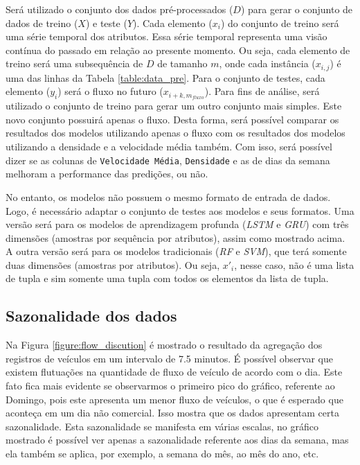 Será utilizado o conjunto dos dados pré-processados (\(D\)) para gerar o conjunto de dados de treino (\(X\)) e teste (\(Y\)). Cada elemento (\(x_i\)) do conjunto de treino  será uma série temporal dos atributos. Essa série temporal representa uma visão contínua do passado em relação ao presente momento. Ou seja, cada elemento de treino será uma subsequência de \(D\) de tamanho \(m\), onde cada instância (\(x_{i, j}\)) é uma das linhas da Tabela \ref{table:data_pre}. Para o conjunto de testes, cada elemento (\(y_i\)) será o fluxo no futuro (\(x_{i + k, m_{fluxo}}\)). Para fins de análise, será utilizado o conjunto de treino para gerar um outro conjunto mais simples. Este novo conjunto possuirá apenas o fluxo. Desta forma, será possível comparar os resultados dos modelos utilizando apenas o fluxo com os resultados dos modelos utilizando a densidade e a velocidade média também. Com isso, será possível dizer se as colunas de \texttt{Velocidade Média}, \texttt{Densidade} e as de dias da semana melhoram a performance das predições, ou não. 

No entanto, os modelos não possuem o mesmo formato de entrada de dados. Logo, é necessário adaptar o conjunto de testes aos modelos e seus formatos. Uma versão será para os modelos de aprendizagem profunda (\textit{\acrshort{LSTM}} e \textit{\acrshort{GRU}}) com três dimensões (amostras por sequência por atributos), assim como mostrado acima. A outra versão será para os modelos tradicionais (\textit{\acrshort{RF}} e \textit{\acrshort{SVM}}), que terá somente duas dimensões (amostras por atributos). Ou seja, \(x'_i\), nesse caso, não é uma lista de tupla e sim somente uma tupla com todos os elementos da lista de tupla.

\subsection{Sazonalidade dos dados}

Na Figura \ref{figure:flow_discution} é mostrado o resultado da agregação dos registros de veículos em um intervalo de 7.5 minutos. É possível observar que existem flutuações na quantidade de fluxo de veículo de acordo com o dia. Este fato fica mais evidente se observarmos o primeiro pico do gráfico, referente ao Domingo, pois este apresenta um menor fluxo de veículos, o que é esperado que aconteça em um dia não comercial. Isso mostra que os dados apresentam certa sazonalidade. Esta sazonalidade se manifesta em várias escalas, no gráfico mostrado é possível ver apenas a sazonalidade referente aos dias da semana, mas ela também se aplica, por exemplo, a semana do mês, ao mês do ano, etc. 


